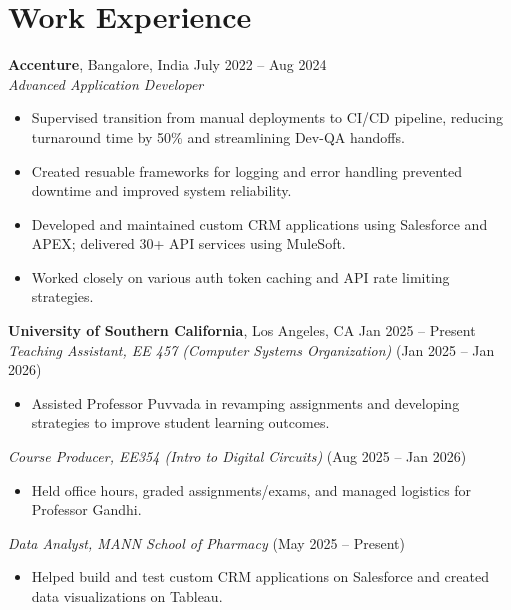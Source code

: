 \documentclass[letterpaper,10pt]{article}
\begin{document}
\section*{Work Experience}
    \textbf{Accenture}, Bangalore, India \hfill July 2022 -- Aug 2024 \\
    \textit{Advanced Application Developer}
    \begin{itemize}[leftmargin=*]
        \item Supervised transition from manual deployments to CI/CD pipeline, reducing turnaround time by 50\% and streamlining Dev-QA handoffs.
        \item Created resuable frameworks for logging and error handling prevented downtime and improved system reliability.
        \item Developed and maintained custom CRM applications using Salesforce and APEX; delivered 30+ API services using MuleSoft.
        \item Worked closely on various auth token caching and API rate limiting strategies.
    \end{itemize}

    \vspace{2pt}
    \textbf{University of Southern California}, Los Angeles, CA \hfill Jan 2025 -- Present \\
    \textit{Teaching Assistant, EE 457 (Computer Systems Organization)} \hfill (Jan 2025 -- Jan 2026)
    \begin{itemize}[leftmargin=*]
        \item Assisted Professor Puvvada in revamping assignments and developing strategies to improve student learning outcomes.
    \end{itemize}

    \textit{Course Producer, EE354 (Intro to Digital Circuits)} \hfill (Aug 2025 -- Jan 2026)
    \begin{itemize}[leftmargin=*]
        \item Held office hours, graded assignments/exams, and managed logistics for Professor Gandhi.
    \end{itemize}
    
    \textit{Data Analyst, MANN School of Pharmacy} \hfill (May 2025 -- Present)
    \begin{itemize}[leftmargin=*]
        \item Helped build and test custom CRM applications on Salesforce and created data visualizations on Tableau.
    \end{itemize}
\end{document}
